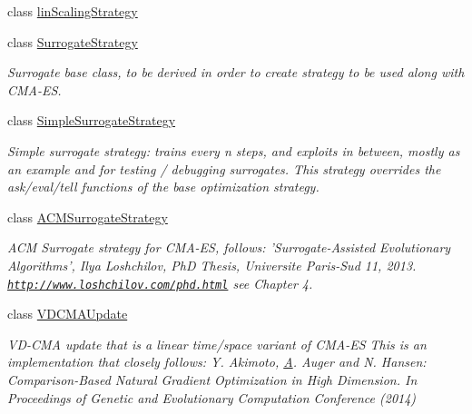 \begin{DoxyCompactItemize}
\item 
class \hyperlink{classlibcmaes_1_1linScalingStrategy}{lin\-Scaling\-Strategy}
\item 
class \hyperlink{classlibcmaes_1_1SurrogateStrategy}{Surrogate\-Strategy}
\begin{DoxyCompactList}\small\item\em Surrogate base class, to be derived in order to create strategy to be used along with C\-M\-A-\/\-E\-S. \end{DoxyCompactList}\item 
class \hyperlink{classlibcmaes_1_1SimpleSurrogateStrategy}{Simple\-Surrogate\-Strategy}
\begin{DoxyCompactList}\small\item\em Simple surrogate strategy\-: trains every n steps, and exploits in between, mostly as an example and for testing / debugging surrogates. This strategy overrides the ask/eval/tell functions of the base optimization strategy. \end{DoxyCompactList}\item 
class \hyperlink{classlibcmaes_1_1ACMSurrogateStrategy}{A\-C\-M\-Surrogate\-Strategy}
\begin{DoxyCompactList}\small\item\em A\-C\-M Surrogate strategy for C\-M\-A-\/\-E\-S, follows\-: 'Surrogate-\/\-Assisted Evolutionary Algorithms', Ilya Loshchilov, Ph\-D Thesis, Universite Paris-\/\-Sud 11, 2013. \href{http://www.loshchilov.com/phd.html}{\tt http\-://www.\-loshchilov.\-com/phd.\-html} see Chapter 4. \end{DoxyCompactList}\item 
class \hyperlink{classlibcmaes_1_1VDCMAUpdate}{V\-D\-C\-M\-A\-Update}
\begin{DoxyCompactList}\small\item\em V\-D-\/\-C\-M\-A update that is a linear time/space variant of C\-M\-A-\/\-E\-S This is an implementation that closely follows\-: Y. Akimoto, \hyperlink{classA}{A}. Auger and N. Hansen\-: Comparison-\/\-Based Natural Gradient Optimization in High Dimension. In Proceedings of Genetic and Evolutionary Computation Conference (2014) \end{DoxyCompactList}\end{DoxyCompactItemize}
